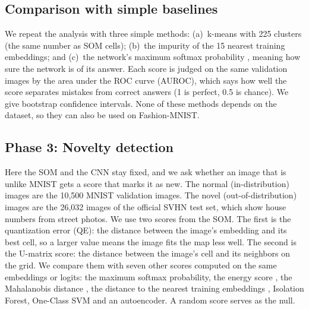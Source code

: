 \documentclass[11pt]{article}
\begin{document}
\subsection{Comparison with simple baselines}

We repeat the analysis with three simple methods: (a)~k-means with 225 clusters (the same number as SOM cells); (b)~the impurity of the 15 nearest training embeddings; and
(c)~the network's maximum softmax probability \parencite{hendrycks2017baseline}, meaning how sure the network is of its answer.
Each score is judged on the same validation images by the area under the ROC curve (AUROC), which says how well the score separates mistakes from correct answers (1 is perfect, 0.5 is chance). We give bootstrap confidence intervals.
None of these methods depends on the dataset, so they can also be used on Fashion-MNIST.

\subsection{Phase 3: Novelty detection}

Here the SOM and the CNN stay fixed, and we ask whether an image that is unlike MNIST gets a score that marks it as new. The normal (in-distribution) images are the 10,500 MNIST validation images. The novel (out-of-distribution) images are the 26,032 images of the official SVHN test set, which show house numbers from street photos.
We use two scores from the SOM. The first is the quantization error (QE): the distance between the image's embedding and its best cell, so a larger value means the image fits the map less well. The second is the U-matrix score: the distance between the image's cell and its neighbors on the grid.
We compare them with seven other scores computed on the same embeddings or logits: the maximum softmax probability, the energy score \parencite{liu2020energy}, the Mahalanobis distance \parencite{lee2018mahalanobis}, the distance to the nearest training embeddings \parencite{sun2022knn}, Isolation Forest, One-Class SVM and an autoencoder.
A random score serves as the null.
\end{document}
